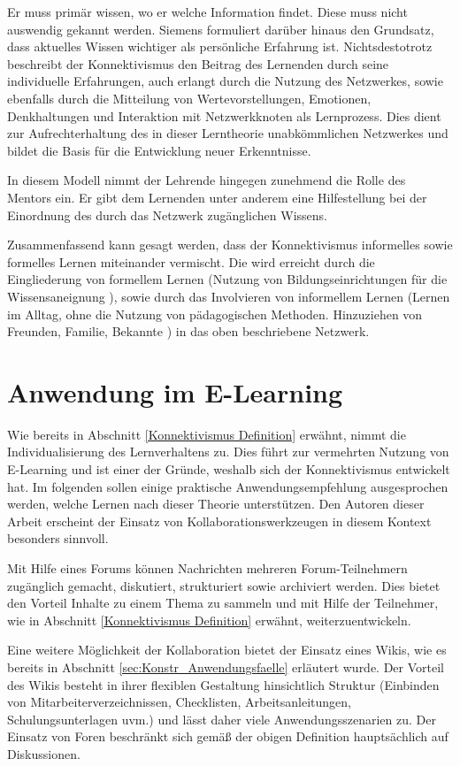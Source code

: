 Er muss primär wissen, wo er welche Information findet. Diese muss nicht auswendig gekannt werden. Siemens formuliert darüber hinaus den Grundsatz, dass aktuelles Wissen wichtiger als persönliche Erfahrung ist. Nichtsdestotrotz beschreibt der Konnektivismus den Beitrag des Lernenden durch seine individuelle Erfahrungen, auch erlangt durch die Nutzung des Netzwerkes, sowie ebenfalls durch die Mitteilung von Wertevorstellungen, Emotionen, Denkhaltungen und Interaktion mit Netzwerkknoten als Lernprozess. Dies dient zur Aufrechterhaltung des in dieser Lerntheorie unabkömmlichen Netzwerkes und bildet die Basis für die Entwicklung neuer Erkenntnisse.

In diesem Modell nimmt der Lehrende hingegen zunehmend die Rolle des Mentors ein. Er gibt dem Lernenden unter anderem eine Hilfestellung bei der Einordnung des durch das Netzwerk zugänglichen Wissens.

Zusammenfassend kann gesagt werden, dass der Konnektivismus informelles sowie formelles Lernen miteinander vermischt.\cite[S. 47ff.]{Kuhlmann.2008} Die wird erreicht durch die Eingliederung von formellem Lernen (Nutzung von Bildungseinrichtungen für die Wissensaneignung \cite[S. 75]{Hellmer.2007}), sowie durch das Involvieren von informellem Lernen (Lernen im Alltag, ohne die Nutzung von pädagogischen Methoden. Hinzuziehen von Freunden, Familie, Bekannte \cite[S. 76]{Hellmer.2007}) in das oben beschriebene Netzwerk.  

\section{Anwendung im E-Learning}
Wie bereits in Abschnitt \ref{Konnektivismus Definition} erwähnt, nimmt die Individualisierung des Lernverhaltens zu. Dies führt zur vermehrten Nutzung von E-Learning und ist einer der Gründe, weshalb sich der Konnektivismus entwickelt hat.\cite[S. 47f.]{Kuhlmann.2008} Im folgenden sollen einige praktische Anwendungsempfehlung ausgesprochen werden, welche Lernen nach dieser Theorie unterstützen. Den Autoren dieser Arbeit erscheint der Einsatz von Kollaborationswerkzeugen in diesem Kontext besonders sinnvoll.

Mit Hilfe eines Forums können Nachrichten mehreren Forum-Teilnehmern zugänglich gemacht, diskutiert, strukturiert sowie archiviert werden. Dies bietet den Vorteil Inhalte zu einem Thema zu sammeln und mit Hilfe der Teilnehmer, wie in Abschnitt \ref{Konnektivismus Definition} erwähnt, weiterzuentwickeln.\cite[S. 67f.]{Drummer.2011}

Eine weitere Möglichkeit der Kollaboration bietet der Einsatz eines Wikis, wie es bereits in Abschnitt \ref{sec:Konstr_Anwendungsfaelle} erläutert wurde. Der Vorteil des Wikis besteht in ihrer flexiblen Gestaltung hinsichtlich Struktur (Einbinden von Mitarbeiterverzeichnissen, Checklisten, Arbeitsanleitungen, Schulungsunterlagen uvm.) und lässt daher viele Anwendungsszenarien zu.\cite[S. 77]{Mertins.2009} Der Einsatz von Foren beschränkt sich gemäß der obigen Definition hauptsächlich auf Diskussionen.